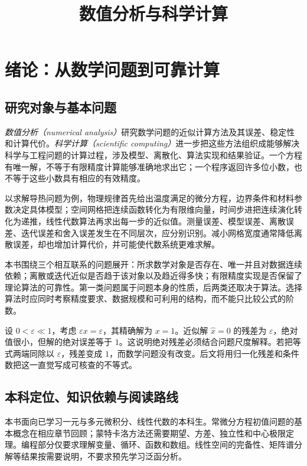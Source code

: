 \documentclass[UTF8,12pt,a4paper,fontset=fandol]{ctexbook}
\title{数值分析与科学计算}
\author{}
\date{}
\begin{document}
\maketitle
\tableofcontents

\chapter{绪论：从数学问题到可靠计算}
\label{chap:na-intro}

\section{研究对象与基本问题}
\emph{数值分析（numerical analysis）}研究数学问题的近似计算方法及其误差、稳定性和计算代价。\emph{科学计算（scientific computing）}进一步把这些方法组织成能够解决科学与工程问题的计算过程，涉及模型、离散化、算法实现和结果验证。一个方程有唯一解，不等于有限精度计算能够准确地求出它；一个程序返回许多位小数，也不等于这些小数具有相应的有效精度。

以求解导热问题为例，物理规律首先给出温度满足的微分方程，边界条件和材料参数决定具体模型；空间网格把连续函数转化为有限维向量，时间步进把连续演化转化为递推，线性代数算法再求出每一步的近似值。测量误差、模型误差、离散误差、迭代误差和舍入误差发生在不同层次，应分别识别。减小网格宽度通常降低离散误差，却也增加计算代价，并可能使代数系统更难求解。

本书围绕三个相互联系的问题展开：所求数学对象是否存在、唯一并且对数据连续依赖；离散或迭代近似是否趋于该对象以及趋近得多快；有限精度实现是否保留了理论算法的可靠性。第一类问题属于问题本身的性质，后两类还取决于算法。选择算法时应同时考察精度要求、数据规模和可利用的结构，而不能只比较公式的阶数。

\begin{example}[很小的残差能说明什么]
\label{ex:na-intro-residual}
设 $0<\varepsilon\ll1$，考虑 $\varepsilon x=\varepsilon$，其精确解为 $x=1$。近似解 $\widehat x=0$ 的残差为 $\varepsilon$，绝对值很小，但解的绝对误差等于 $1$。这说明绝对残差必须结合问题尺度解释。若把等式两端同除以 $\varepsilon$，残差变成 $1$，而数学问题没有改变。后文将用归一化残差和条件数把这一直觉写成可核查的不等式。
\end{example}

\section{本科定位、知识依赖与阅读路线}
本书面向已学习一元与多元微积分、线性代数的本科生。常微分方程初值问题的基本概念在相应章节回顾；蒙特卡洛方法还需要期望、方差、独立性和中心极限定理。编程部分仅要求理解变量、循环、函数和数组。线性空间的完备性、矩阵谱分解等结果按需要说明，不要求预先学习泛函分析。
\end{document}
